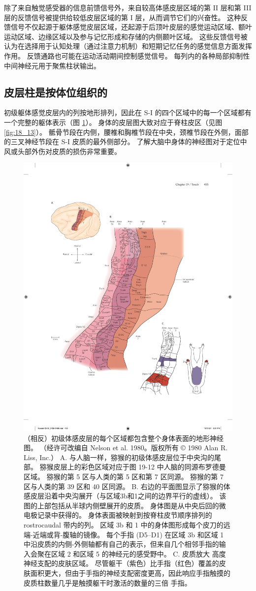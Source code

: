 除了来自触觉感受器的信息前馈信号外，来自较高体感皮层区域的第 II 层和第 III 层的反馈信号被提供给较低皮层区域的第 I 层，从而调节它们的兴奋性。 
这种反馈信号不仅起源于躯体感觉皮层区域，还起源于后顶叶皮层的感觉运动区域、额叶运动区域、边缘区域以及参与记忆形成和存储的内侧颞叶区域。 
这些反馈信号被认为在选择用于认知处理（通过注意力机制）和短期记忆任务的感觉信息方面发挥作用。 
反馈通路也可能在运动活动期间控制感觉信号。 
每列内的各种局部抑制性中间神经元用于聚焦柱状输出。


\subsection{皮层柱是按体位组织的}
初级躯体感觉皮层内的列按地形排列，因此在 S-I 的四个区域中的每一个区域都有一个完整的躯体表示（图 \ref{fig:19_15}）。 
身体的皮层图大致对应于脊柱皮区（见图 \ref{fig:18_13}）。 
骶骨节段在内侧，腰椎和胸椎节段在中央，颈椎节段在外侧，面部的三叉神经节段在 S-I 皮质的最外侧部分。 
了解大脑中身体的神经图对于定位中风或头部外伤对皮质的损伤非常重要。


\begin{figure}[htbp]
	\centering
	\includegraphics[width=0.5\linewidth]{chap19/fig_19_15}
	\caption{（相反）初级体感皮层的每个区域都包含整个身体表面的地形神经图。 （经许可改编自 Nelson et al. 1980。版权所有 © 1980 Alan R. Liss, Inc.） 
		A. 与人脑一样，猕猴的初级体感皮层位于中央沟的尾部。 
		猕猴皮层上的彩色区域对应于图 19-12 中人脑的同源布罗德曼区域。 
		猕猴的第 5 区与人类的第 5 区和第 7 区同源。 
		猕猴的第 7 区与人类的第 39 区和 40 区同源。 
		B. 右边的平面图显示了猕猴的体感皮层沿着中央沟展开（与区域3b和1之间的边界平行的虚线）。 
		该图的上部包括从半球内侧壁展开的皮质。 
		身体图是从中央后回的微电极记录中获得的。 
		身体表面被映射到按脊柱皮节顺序排列的 rostrocaudal 带内的列。 
		区域 3b 和 1 中的身体图形成每个皮刀的远端-近端或背-腹轴的镜像。 
		每个手指 (D5–D1) 在区域 3b 和区域 1 中沿皮质的内侧-外侧轴都有自己的表示，但来自几个相邻手指的输入会聚在区域 2 和区域 5 的神经元的感受野中。
		C. 皮质放大 高度神经支配的皮肤区域。 
		尽管躯干（紫色）比手指（红色）覆盖的皮肤面积更大，但由于手指的神经支配密度更高，因此响应手指触摸的皮质柱数量几乎是触摸躯干时激活的数量的三倍 手指。}
	\label{fig:19_15}
\end{figure}

